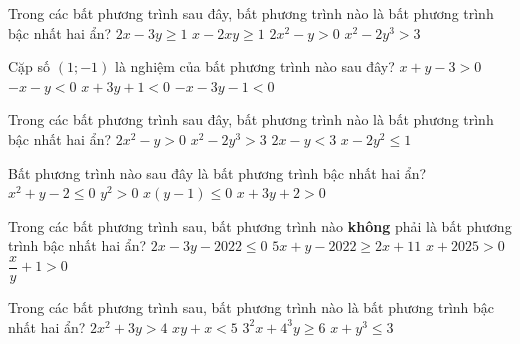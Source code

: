 \begin{ex}%
	Trong các bất  phương trình sau đây, bất phương trình nào là bất phương trình bậc nhất hai ẩn?
	\choice 
		{\True  $2x-3y\ge 1$}
		{$x-2xy\ge  1$}
		{$2x^2-y >  0$}
		{$x^2-2y^3>  3$}
\end{ex}

\begin{ex}%
	Cặp số $(1;-1)$ là nghiệm của bất phương trình nào sau đây? 
	\choice 
		 {$x+y-3> 0$}
		{$-x-y <  0$}
		{\True  $x+3y+1< 0$}
		{$-x-3y-1<  0$}
\end{ex}

\begin{ex}%
	Trong các bất phương trình sau đây, bất phương trình nào là bất phương trình bậc nhất  hai ẩn?
	\choice 
		{$2x^2-y >  0$}
		 {$x^2-2y^3 > 3$}
		{\True  $2x-y < 3$}
		{$x-2y^2\le 1$} 
\end{ex}

\begin{ex}%
	Bất phương trình nào sau đây là bất phương trình bậc nhất  hai ẩn?
	 \choice
		{$x^2+y-2\le  0$}
		 {$y^2> 0$}
		{$x\left(y-1\right)\le  0$}
		{\True $x+3y+2> 0$} 
\end{ex}

\begin{ex}%
	Trong các bất phương trình sau,  bất phương trình nào \textbf{không} phải là bất phương trình bậc nhất hai ẩn?
	 \choice
		 {$2x-3y-2022\le 0$}
		{$5x+y-2022\ge 2x+11$} 
		{$x+2025>0$} 
		{\True $\dfrac{x}{y}+1>0$} 
\end{ex}

\begin{ex}%
	Trong  các bất phương trình sau, bất phương trình nào là bất phương trình bậc nhất hai ẩn?
	\choice 
		{$2x^2+3y>4$} 
		 {$xy+x<5$}
		{\True $3^2x+4^3y\ge 6$} 
		{$x+y^3\le 3$} 
\end{ex}

